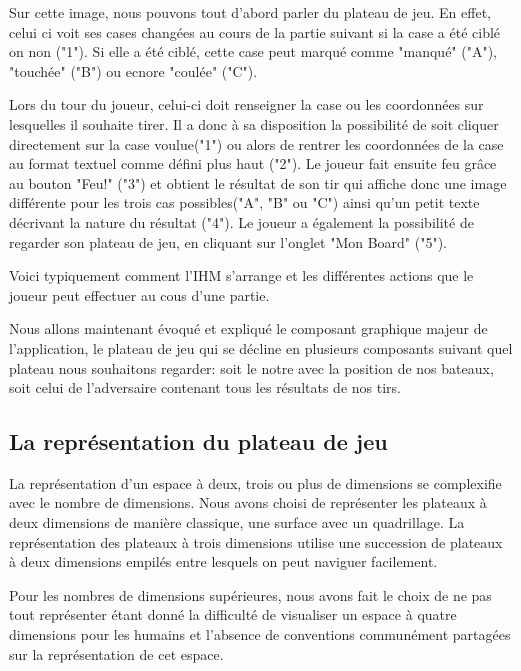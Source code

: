	Sur cette image, nous pouvons tout d'abord parler du plateau de jeu. En effet, celui ci voit ses cases changées au cours de la partie suivant si la case a été ciblé on non ("1"). Si elle a été ciblé, cette case peut marqué comme "manqué" ("A"), "touchée" ("B") ou ecnore "coulée" ("C").
	\newline
	
	Lors du tour du joueur, celui-ci doit renseigner la case ou les coordonnées sur lesquelles il souhaite tirer. Il a donc à sa disposition la possibilité de soit cliquer directement sur la case voulue("1") ou alors de rentrer les coordonnées de la case au format textuel comme défini plus haut ("2"). Le joueur fait ensuite feu grâce au bouton "Feu!" ("3") et obtient le résultat de son tir qui affiche donc une image différente pour les trois cas possibles("A", "B" ou "C") ainsi qu'un petit texte décrivant la nature du résultat ("4"). Le joueur a également la possibilité de regarder son plateau de jeu, en cliquant sur l'onglet "Mon Board" ("5").
\newline

	Voici typiquement comment l'IHM s'arrange et les différentes actions que le joueur peut effectuer au cous d'une partie. 
	 \newline
	  
	Nous allons maintenant évoqué et expliqué le composant graphique majeur de l'application, le plateau de jeu qui se décline en plusieurs composants suivant quel plateau nous souhaitons regarder: soit le notre avec la position de nos bateaux, soit celui de l'adversaire contenant tous les résultats de nos tirs.

\subsection{La représentation du plateau de jeu}
	La représentation d'un espace à deux, trois ou plus de dimensions se complexifie avec le nombre de dimensions.
Nous avons choisi de représenter les plateaux à deux dimensions de manière classique, une surface avec un quadrillage. La représentation des plateaux à trois dimensions utilise une succession de plateaux à deux dimensions empilés entre lesquels on peut naviguer facilement. \newline

	Pour les nombres de dimensions supérieures, nous avons fait le choix de ne pas tout représenter étant donné la difficulté de visualiser un espace à quatre dimensions pour les humains et l'absence de conventions communément partagées sur la représentation de cet espace.

